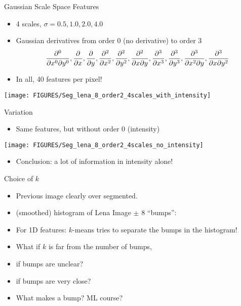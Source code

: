 \documentclass[9pt]{beamer}
\begin{document}
\begin{frame}[t]{Gaussian Scale Space Features}
  \begin{itemize}
  \item 4 scales, $\sigma = 0.5, 1.0, 2.0, 4.0$
  \item Gaussian derivatives from order 0 (no derivative) to order 3
    $$
    \frac{\partial^{0}{}}{\partial{x^0\partial
      y^0}},\frac{\partial{}}{\partial{x}},\frac{\partial{}}{\partial{y}},\frac{\partial^{2}{}}{\partial{x^2}},\frac{\partial^{2}{}}{\partial{y^2}},\frac{\partial^{2}{}}{\partial{x\partial
      y}},\frac{\partial^{3}{}}{\partial{x^3}},\frac{\partial^{3}{}}{\partial{y^3}},\frac{\partial^{3}{}}{\partial{x^2\partial
      y}},\frac{\partial^{3}{}}{\partial{x\partial y^2}}
    $$
  \item In all, 40 features per pixel!
  \end{itemize}
  
  \begin{center}
    \texttt{[image: FIGURES/Seg\_lena\_8\_order2\_4scales\_with\_intensity]}
  \end{center}
 
  
\end{frame}


\begin{frame}[t]{Variation}
  \begin{itemize}
  \item Same features, but without order 0 (intensity)
  \end{itemize}
  \begin{center}
    \texttt{[image: FIGURES/Seg\_lena\_8\_order2\_4scales\_no\_intensity]}
  \end{center}
  \begin{itemize}
  \item Conclusion: a lot of information in intensity alone!
  \end{itemize}
  \pause
  \begin{center}
  \end{center}

\end{frame}


\begin{frame}[t]{Choice of $k$}
  \begin{itemize}
    \item Previous image clearly over segmented.
  \item (smoothed) histogram of Lena Image $\pm$ 8 ``bumps'':
    \begin{center}
    \end{center}
  \item For 1D features: $k$-means tries to separate the bumps in the histogram!
  \item What if $k$ is far from the number of bumps,
  \item if bumps are unclear?
  \item if bumps are very close?
  \item What makes a bump? ML course?
    \pause
\end{itemize}
\end{frame}
\end{document}
